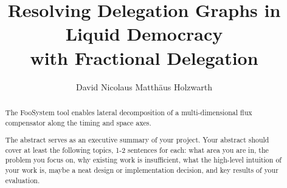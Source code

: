 \documentclass[a4paper,11pt,oneside]{report}
\title{Resolving Delegation Graphs in Liquid Democracy\\ with Fractional Delegation}
\author{David Nicolaus Matthäus Holzwarth}
\newcommand{\sysname}{FooSystem\xspace}
\begin{document}
\maketitle


\begin{abstract}
The \sysname tool enables lateral decomposition of a multi-dimensional
flux compensator along the timing and space axes.

The abstract serves as an executive summary of your project.
Your abstract should cover at least the following topics, 1-2 sentences for
each: what area you are in, the problem you focus on, why existing work is
insufficient, what the high-level intuition of your work is, maybe a neat
design or implementation decision, and key results of your evaluation.
\end{abstract}


\maketoc










\cleardoublepage
{}
{}
\printbibliography

%
%
\end{document}

